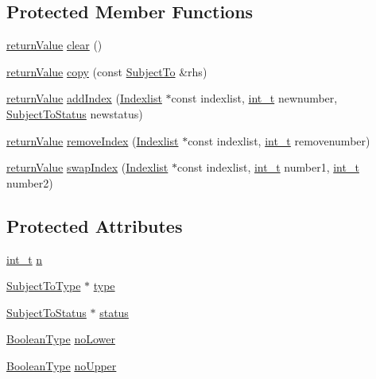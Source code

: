 \subsection*{Protected Member Functions}
\begin{DoxyCompactItemize}
\item 
\hyperlink{_message_handling_8hpp_a81d556f613bfbabd0b1f9488c0fa865e}{return\+Value} \hyperlink{class_subject_to_a0b48052eada79f7688475f9bc42b2a0b}{clear} ()
\item 
\hyperlink{_message_handling_8hpp_a81d556f613bfbabd0b1f9488c0fa865e}{return\+Value} \hyperlink{class_subject_to_a996c9fba06e918ded5cdc87eaffc3a6b}{copy} (const \hyperlink{class_subject_to}{Subject\+To} \&rhs)
\item 
\hyperlink{_message_handling_8hpp_a81d556f613bfbabd0b1f9488c0fa865e}{return\+Value} \hyperlink{class_subject_to_a83c1986b050f0ca61105889439463be8}{add\+Index} (\hyperlink{class_indexlist}{Indexlist} $\ast$const indexlist, \hyperlink{_types_8hpp_ab6fd6105e64ed14a0c9281326f05e623}{int\+\_\+t} newnumber, \hyperlink{_types_8hpp_a70a6a40d261a015ead8d43aa589383a4}{Subject\+To\+Status} newstatus)
\item 
\hyperlink{_message_handling_8hpp_a81d556f613bfbabd0b1f9488c0fa865e}{return\+Value} \hyperlink{class_subject_to_a2fd214bb2d286f7ecbf29beb6787a984}{remove\+Index} (\hyperlink{class_indexlist}{Indexlist} $\ast$const indexlist, \hyperlink{_types_8hpp_ab6fd6105e64ed14a0c9281326f05e623}{int\+\_\+t} removenumber)
\item 
\hyperlink{_message_handling_8hpp_a81d556f613bfbabd0b1f9488c0fa865e}{return\+Value} \hyperlink{class_subject_to_aa67ba18d9afa09a0bad98a3d0d6b67e8}{swap\+Index} (\hyperlink{class_indexlist}{Indexlist} $\ast$const indexlist, \hyperlink{_types_8hpp_ab6fd6105e64ed14a0c9281326f05e623}{int\+\_\+t} number1, \hyperlink{_types_8hpp_ab6fd6105e64ed14a0c9281326f05e623}{int\+\_\+t} number2)
\end{DoxyCompactItemize}
\subsection*{Protected Attributes}
\begin{DoxyCompactItemize}
\item 
\hyperlink{_types_8hpp_ab6fd6105e64ed14a0c9281326f05e623}{int\+\_\+t} \hyperlink{class_subject_to_a0a3c9f9e21374c16a8d8e0f348454566}{n}
\item 
\hyperlink{_types_8hpp_a3e65c061dde41562d1aeb2c4453bf1d3}{Subject\+To\+Type} $\ast$ \hyperlink{class_subject_to_aad4d39d990754d086c85d04f3ec42e68}{type}
\item 
\hyperlink{_types_8hpp_a70a6a40d261a015ead8d43aa589383a4}{Subject\+To\+Status} $\ast$ \hyperlink{class_subject_to_a704f3dcdc56f92bc5b80fbc77a240824}{status}
\item 
\hyperlink{_types_8hpp_a20f82124c82b6f5686a7fce454ef9089}{Boolean\+Type} \hyperlink{class_subject_to_a9943eec4a40ae6ff955b7b86adae4afb}{no\+Lower}
\item 
\hyperlink{_types_8hpp_a20f82124c82b6f5686a7fce454ef9089}{Boolean\+Type} \hyperlink{class_subject_to_a3fd6e5e40b6ff6a568bd029c88a29dc8}{no\+Upper}
\end{DoxyCompactItemize}


